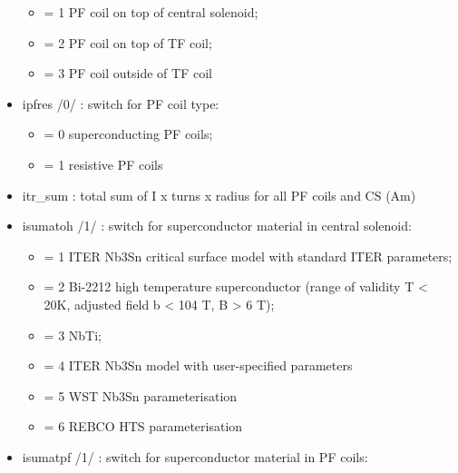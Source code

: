 \documentclass[]{article}
\providecommand{\tightlist}{%
  \setlength{\itemsep}{0pt}\setlength{\parskip}{0pt}}
\begin{document}
\begin{itemize}
  \begin{itemize}
  \tightlist
  \item
    = 1 PF coil on top of central solenoid;
  \item
    = 2 PF coil on top of TF coil;
  \item
    = 3 PF coil outside of TF coil
  \end{itemize}
\item
  ipfres /0/ : switch for PF coil type:

  \begin{itemize}
  \tightlist
  \item
    = 0 superconducting PF coils;
  \item
    = 1 resistive PF coils
  \end{itemize}
\item
  itr\_sum : total sum of I x turns x radius for all PF coils and CS
  (Am)
\item
  isumatoh /1/ : switch for superconductor material in central solenoid:

  \begin{itemize}
  \tightlist
  \item
    = 1 ITER Nb3Sn critical surface model with standard ITER parameters;
  \item
    = 2 Bi-2212 high temperature superconductor (range of validity T
    \textless{} 20K, adjusted field b \textless{} 104 T, B
    \textgreater{} 6 T);
  \item
    = 3 NbTi;
  \item
    = 4 ITER Nb3Sn model with user-specified parameters
  \item
    = 5 WST Nb3Sn parameterisation
  \item
    = 6 REBCO HTS parameterisation
  \end{itemize}
\item
  isumatpf /1/ : switch for superconductor material in PF coils:


\end{itemize}
\end{document}
